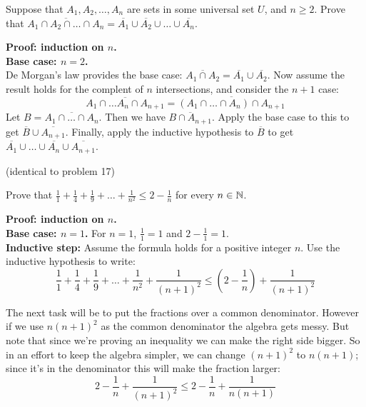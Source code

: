 \documentclass{article}
\begin{document}
\begin{problem}
Suppose that $A_1, A_2, \ldots, A_n$ are sets in some universal set $U$, and $n \geq 2$. Prove that $\overline{A_1 \cap A_2 \cap \ldots \cap A_n} = \overline{A_1} \cup \overline{A_2} \cup \ldots \cup \overline{A_n}$.
\end{problem}
\textbf{Proof: induction on $n$.}
\\
\textbf{Base case: $n = 2$.}
\\

De Morgan's law provides the base case: $\overline{A_1 \cap A_2} = \overline{A_1} \cup \overline{A_2}$. Now assume the result holds for the complent of $n$ intersections, and consider the $n+1$ case:
$$\overline{A_1 \cap \ldots A_n \cap A_{n+1}} = \overline{(A_1 \cap \ldots \cap A_n) \cap A_{n+1}}$$
Let $B = \overline{A_1 \cap \ldots \cap A_n}$. Then we have $\overline{B \cap A_{n+1}}$. Apply the base case to this to get $\overline{B} \cup \overline{A_{n+1}}$. Finally, apply the inductive hypothesis to $\overline{B}$ to get $\overline{A_1} \cup \ldots \cup \overline{A_n} \cup \overline{A_{n+1}}$.

\begin{problem}
(identical to problem 17)
\end{problem}

\begin{problem}
Prove that $\frac{1}{1} + \frac{1}{4} + \frac{1}{9} + \ldots + \frac{1}{n^2} \leq 2 - \frac{1}{n}$ for every $n \in \mathbb{N}$.
\end{problem}

\textbf{Proof: induction on $n$.}
\\

\textbf{Base case: $n = 1$.} For $n = 1$, $\frac{1}{1} = 1$ and $2 - \frac{1}{1} = 1$.
\\

\textbf{Inductive step:} Assume the formula holds for a positive integer $n$. Use the inductive hypothesis to write:
$$\frac{1}{1} + \frac{1}{4} + \frac{1}{9} + \ldots + \frac{1}{n^2} + \frac{1}{(n+1)^2} \leq \left(2 - \frac{1}{n}\right) + \frac{1}{(n+1)^2}$$

The next task will be to put the fractions over a common denominator. However if we use $n(n+1)^2$ as the common denominator the algebra gets messy. But note that since we're proving an inequality we can make the right side bigger. So in an effort to keep the algebra simpler, we can change $(n+1)^2$ to $n(n+1)$; since it's in the denominator this will make the fraction larger:
$$2 - \frac{1}{n} + \frac{1}{(n+1)^2} \leq 2 - \frac{1}{n} + \frac{1}{n(n+1)}$$
\end{document}
